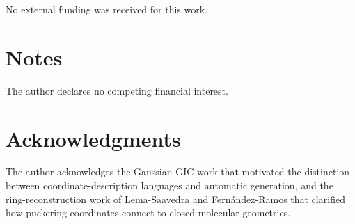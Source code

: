 \documentclass[journal=jctcce,manuscript=article,layout=traditional]{achemso}
\theoremstyle{definition}
\begin{document}
No external funding was received for this work.

\section*{Notes}

The author declares no competing financial interest.

\section*{Acknowledgments}

The author acknowledges the Gaussian GIC work that motivated the distinction
between coordinate-description languages and automatic generation, and the
ring-reconstruction work of Lema-Saavedra and Fern{\'a}ndez-Ramos that clarified
how puckering coordinates connect to closed molecular geometries.


\end{document}
